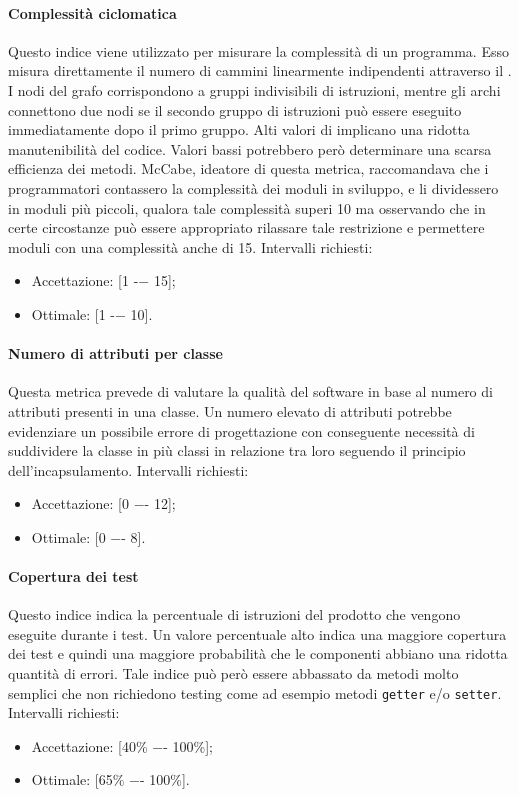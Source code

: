 \paragraph{Complessità ciclomatica}
Questo indice viene utilizzato per misurare la complessità di un programma. Esso misura direttamente il numero di cammini linearmente indipendenti attraverso il . I nodi del grafo corrispondono a gruppi indivisibili di istruzioni, mentre gli archi connettono due nodi se il secondo gruppo di istruzioni può essere eseguito immediatamente dopo il primo gruppo.
Alti valori di  implicano una ridotta manutenibilità del codice. Valori bassi potrebbero però determinare  una scarsa efficienza dei metodi. McCabe, ideatore di questa metrica, raccomandava che i programmatori contassero la complessità dei moduli in sviluppo, e li dividessero in moduli più piccoli, qualora tale complessità superi 10 ma osservando che in certe circostanze può essere appropriato rilassare tale restrizione e permettere moduli con una complessità anche di 15.
Intervalli richiesti:
\begin{itemize}
\item
Accettazione: [1 -− 15];
\item
Ottimale: [1 -− 10].
\end{itemize}

\paragraph{Numero di attributi per classe}
Questa metrica prevede di valutare la qualità del software in base al numero di attributi presenti in una classe.
Un numero elevato di attributi potrebbe evidenziare un possibile errore di progettazione con conseguente necessità di suddividere la classe in più classi in relazione tra loro seguendo il principio dell'incapsulamento.
Intervalli richiesti:
\begin{itemize}
\item
Accettazione: [0 −- 12];
\item
Ottimale: [0 −- 8].
\end{itemize}

\paragraph{Copertura dei test}
Questo indice indica la percentuale di istruzioni del prodotto che vengono eseguite durante i test.
Un valore percentuale alto indica una maggiore copertura dei test e quindi una maggiore probabilità che le componenti abbiano una ridotta quantità di errori.
Tale indice può però essere abbassato da metodi molto semplici che non richiedono testing come ad esempio metodi \texttt{getter} e/o \texttt{setter}.
Intervalli richiesti:
\begin{itemize}
\item
Accettazione: [40\% −- 100\%];
\item
Ottimale: [65\% −- 100\%].
\end{itemize}

